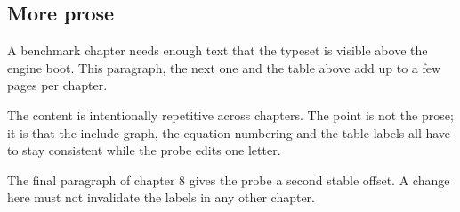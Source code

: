 \subsection{More prose}
A benchmark chapter needs enough text that the type\-set is visible above the
engine boot. This paragraph, the next one and the table above add up to a few
pages per chapter.

The content is intentionally repetitive across chapters. The point is not the
prose; it is that the include graph, the equation numbering and the table
labels all have to stay consistent while the probe edits one letter.

The final paragraph of chapter 8 gives the probe a second stable offset. A
change here must not invalidate the labels in any other chapter.
